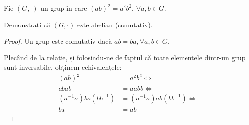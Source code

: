 \begin{exercise}
Fie \((G, \cdot)\) un grup în care \((a b)^2 = a^2 b^2\), \(\forall a, b \in G\).

Demonstrați că \((G, \cdot)\) este abelian (comutativ).
\end{exercise}
\begin{proof}
Un grup este comutativ dacă \(ab = ba, \forall a, b \in G\).

Plecând de la relație, și folosindu-ne de faptul că toate elementele dintr-un grup sunt inversabile, obținem echivalențele:
\begin{align*}
    (a b)^2 &= a^2 b^2 \iff \\
    a b a b &= a a b b \iff \\
    (a^{-1} a) b a (b b^{-1}) &= (a^{-1} a) a b (b b^{-1}) \iff \\
    b a &= a b
\end{align*}
\end{proof}

